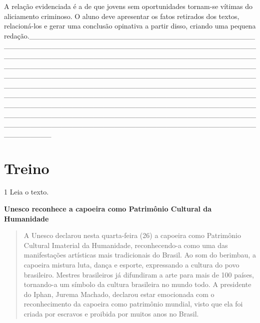 {A relação evidenciada é a de que jovens sem oportunidades tornam-se
vítimas do aliciamento criminoso. O aluno deve apresentar os fatos
retirados dos textos, relacioná-los e gerar uma conclusão opinativa a
partir disso, criando uma pequena
redação.\_\_\_\_\_\_\_\_\_\_\_\_\_\_\_\_\_\_\_\_\_\_\_\_\_\_\_\_\_\_\_\_\_\_\_\_\_\_\_\_\_\_\_\_\_\_\_\_\_\_\_\_\_\_\_\_\_\_\_\_\_\_\_\_\_\_\_\_\_\_\_\_\_\_\_\_\_\_\_\_\_\_\_\_\_\_\_\_\_\_\_\_\_\_\_\_\_\_\_\_\_\_\_\_\_\_\_\_\_\_\_\_\_\_\_\_\_\_\_\_\_\_\_\_\_\_\_\_\_\_\_\_\_\_\_\_\_\_\_\_\_\_\_\_\_\_\_\_\_\_\_\_\_\_\_\_\_\_\_\_\_\_\_\_\_\_\_\_\_\_\_\_\_\_\_\_\_\_\_\_\_\_\_\_\_\_\_\_\_\_\_\_\_\_\_\_\_\_\_\_\_\_\_\_\_\_\_\_\_\_\_\_\_\_\_\_\_\_\_\_\_\_\_\_\_\_\_\_\_\_\_\_\_\_\_\_\_\_\_\_\_\_\_\_\_\_\_\_\_\_\_\_\_\_\_\_\_\_\_\_\_\_\_\_\_\_\_\_\_\_\_\_\_\_\_\_\_\_\_\_\_\_\_\_\_\_\_\_\_\_\_\_\_\_\_\_\_\_\_\_\_\_\_\_\_\_\_\_\_\_\_\_\_\_\_\_\_\_\_\_\_\_\_\_\_\_\_\_\_\_\_\_\_\_\_\_\_\_\_\_\_\_\_\_\_\_\_\_\_\_\_\_\_\_\_\_\_\_\_\_\_\_\_\_\_\_\_\_\_\_\_\_\_\_\_\_\_\_\_\_\_\_\_\_\_\_\_\_\_\_\_\_\_\_\_\_\_\_\_\_\_\_\_\_\_\_\_\_\_\_\_\_\_\_\_\_\_\_\_\_\_\_\_\_\_\_\_\_\_\_\_\_\_\_\_\_\_\_\_\_\_\_\_\_\_\_\_\_\_\_\_\_\_\_\_\_\_\_\_\_\_\_\_\_\_\_\_\_\_\_\_\_\_\_\_\_\_\_\_\_\_\_\_\_\\
}

\section{Treino}

\num{1} Leia o texto.

\textbf{Unesco reconhece a capoeira como Patrimônio Cultural da Humanidade}

\begin{quote}
A Unesco declarou nesta quarta-feira (26) a capoeira como Patrimônio
Cultural Imaterial da Humanidade, reconhecendo-a como uma das
manifestações artísticas mais tradicionais do Brasil. Ao som do
berimbau, a capoeira mistura luta, dança e esporte, expressando a
cultura do povo brasileiro. Mestres brasileiros já difundiram a arte
para mais de 100 países, tornando-a um símbolo da cultura brasileira no
mundo todo. A presidente do Iphan, Jurema Machado, declarou estar
emocionada com o reconhecimento da capoeira como patrimônio mundial,
visto que ela foi criada por escravos e proibida por muitos anos no
Brasil.
\end{quote}


